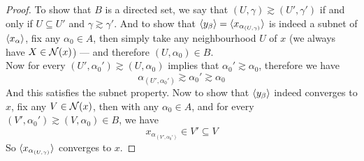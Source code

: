 \documentclass[../../main.tex]{subfiles}
\begin{document}
\begin{proof}
To show that $B$ is a directed set, we say that $(U,\gamma)\gtrsim (U',\gamma')$ if and only if $U\subseteq U'$ and $\gamma\gtrsim\gamma'$. And to show that $\langle {y_\beta} \rangle = \langle {x_{\alpha_{(U,\gamma)}}} \rangle$ is indeed a subnet of $\langle {x_\alpha} \rangle$, fix any $\alpha_0\in A$, then simply take any neighbourhood $U$ of $x$ (we always have $X\in\mathcal{N}({x})$) — and therefore $(U,\alpha_0)\in B$.\\

Now for every $(U',\alpha_0')\gtrsim(U,\alpha_0)$ implies that $\alpha_0'\gtrsim\alpha_0$, therefore we have 
\[
\alpha_{(U',\alpha_0')}\gtrsim\alpha_0'\gtrsim\alpha_0
\]
And this satisfies the subnet property. Now to show that $\langle {y_\beta} \rangle$ indeed converges to $x$, fix any $V\in\mathcal{N}({x})$, then with any $\alpha_0\in A$, and for every $(V',\alpha_0')\gtrsim(V,\alpha_0)\in B$, we have
\[
x_{\alpha_{(V',\alpha_0')}}\in V'\subseteq V
\]
So $\langle {x_{\alpha_{(U,\gamma)}}} \rangle$ converges to $x$.
\end{proof}
\end{document}
